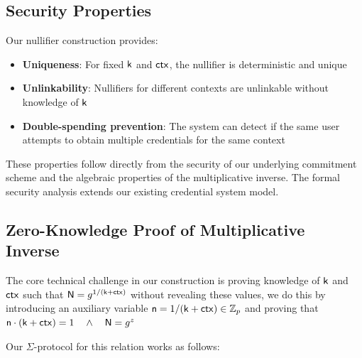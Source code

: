 \subsection{Security Properties}
Our nullifier construction provides:

\begin{itemize}
    \item \textbf{Uniqueness}: For fixed $\mathsf{k}$ and $\mathsf{ctx}$, the nullifier is deterministic and unique
    \item \textbf{Unlinkability}: Nullifiers for different contexts are unlinkable without knowledge of $\mathsf{k}$
    \item \textbf{Double-spending prevention}: The system can detect if the same user attempts to obtain multiple credentials for the same context
\end{itemize}

These properties follow directly from the security of our underlying commitment scheme and the algebraic properties of the multiplicative inverse. The formal security analysis extends our existing credential system model.



\subsection{Zero-Knowledge Proof of Multiplicative Inverse}
The core technical challenge in our construction is proving knowledge of $\mathsf{k}$ and $\mathsf{ctx}$ such that $\mathsf{N} = g^{1/(\mathsf{k} + \mathsf{ctx})}$ without revealing these values, we do this by introducing an auxiliary variable $\mathsf{n} = 1/(\mathsf{k} + \mathsf{ctx}) \in \mathbb{Z}_p$ and proving that $\mathsf{n} \cdot (\mathsf{k} + \mathsf{ctx}) = 1 \quad \wedge \quad \mathsf{N} = g^z$

Our $\Sigma$-protocol for this relation works as follows:

